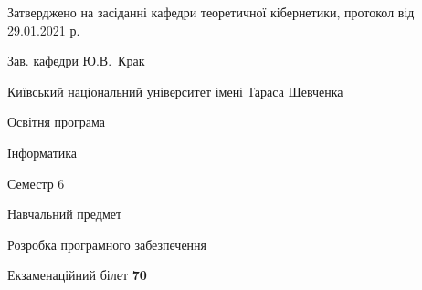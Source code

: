 \documentclass[10pt, ukrainian]{article}
\begin{document}
{\vspace{5mm}\smallskip \begin {small} Затверджено на засіданні кафедри теоретичної кібернетики, протокол  від   29.01.2021 р.\par\smallskip\smallskip
{\parbox {6.5 cm}{Зав. кафедри \dotfill Ю.В.~Крак}} \end{small}}
\newpage

{{\begin {small}\par
{ \center  Київський національний університет імені Тараса Шевченка \par}
{\parbox {5 cm}{Освітня програма \hfill}{\parbox {7 cm}{Інформатика \hfill}}\parbox {6 cm}{\hfill Семестр 6}}\par
{\parbox {5 cm} {Навчальний предмет \hfill}\parbox {7 cm}{Розробка програмного забезпечення \hfill}\parbox {6cm}{\hfill}\par}\vspace{-7pt} \end{small}}{\center Екзаменаційний білет \No \textbf
{ 70 }\par}}
\end{document}
